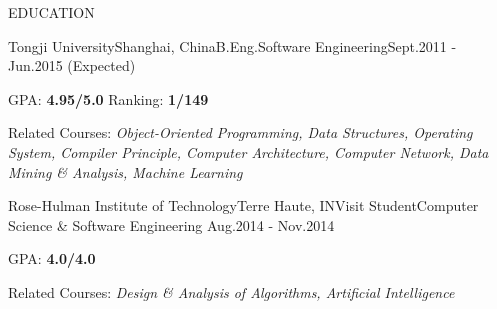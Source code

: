 \documentclass{resume} %
\begin{document}

\begin{rSection}{EDUCATION}

  \begin{eSubsection}{Tongji University}{Shanghai, China}{B.Eng.}{Software Engineering}{Sept.2011 - Jun.2015
    (Expected)}
  \item GPA: {\bf 4.95/5.0} \space\space Ranking: {\bf 1/149}
  \item Related Courses: {\em Object-Oriented Programming, Data Structures, Operating System, Compiler Principle,
    Computer Architecture, Computer Network, Data Mining \& Analysis, Machine Learning}
  \end{eSubsection}

  \begin{eSubsection}{Rose-Hulman Institute of Technology}{Terre Haute, IN}{Visit Student}{Computer
    Science \& Software Engineering}{ Aug.2014 - Nov.2014}
  \item GPA: {\bf 4.0/4.0}
  \item Related Courses: {\em Design \& Analysis of Algorithms, Artificial Intelligence}
  \end{eSubsection}

\end{rSection}

\end{document}
